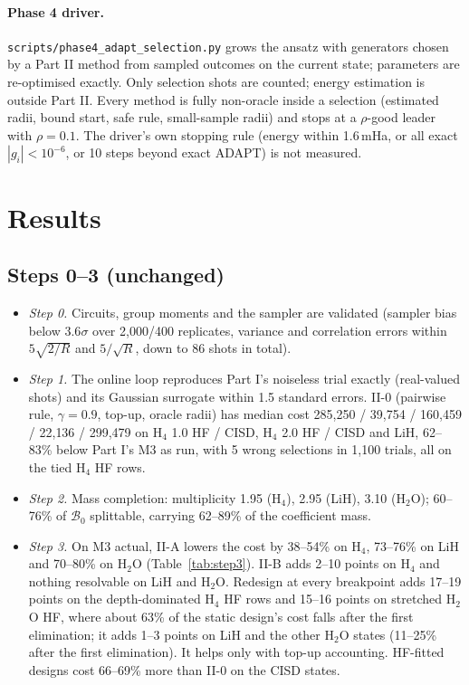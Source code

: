 \documentclass[10.5pt]{article}
\newcommand{\code}[1]{\texttt{#1}}
\begin{document}
\paragraph{Phase 4 driver.}
\code{scripts/phase4\_adapt\_selection.py} grows the ansatz with generators chosen by a Part II method from sampled outcomes on the current state; parameters are re-optimised exactly. Only selection shots are counted; energy estimation is outside Part II. Every method is fully non-oracle inside a selection (estimated radii, bound start, safe rule, small-sample radii) and stops at a $\rho$-good leader with $\rho=0.1$. The driver's own stopping rule (energy within 1.6\,mHa, or all exact $|g_i|<10^{-6}$, or 10 steps beyond exact ADAPT) is not measured.

\section{Results}
\label{sec:results}

\subsection{Steps 0--3 (unchanged)}

\begin{itemize}
  \item \emph{Step 0.} Circuits, group moments and the sampler are validated (sampler bias below $3.6\sigma$ over 2{,}000/400 replicates, variance and correlation errors within $5\sqrt{2/R}$ and $5/\sqrt R$, down to 86 shots in total).
  \item \emph{Step 1.} The online loop reproduces Part I's noiseless trial exactly (real-valued shots) and its Gaussian surrogate within 1.5 standard errors. II-0 (pairwise rule, $\gamma=0.9$, top-up, oracle radii) has median cost 285{,}250 / 39{,}754 / 160{,}459 / 22{,}136 / 299{,}479 on H$_4$ 1.0 HF / CISD, H$_4$ 2.0 HF / CISD and LiH, 62--83\% below Part I's M3 as run, with 5 wrong selections in 1{,}100 trials, all on the tied H$_4$ HF rows.
  \item \emph{Step 2.} Mass completion: multiplicity 1.95 (H$_4$), 2.95 (LiH), 3.10 (H$_2$O); 60--76\% of $\mathcal B_0$ splittable, carrying 62--89\% of the coefficient mass.
  \item \emph{Step 3.} On M3 actual, II-A lowers the cost by 38--54\% on H$_4$, 73--76\% on LiH and 70--80\% on H$_2$O (Table~\ref{tab:step3}). II-B adds 2--10 points on H$_4$ and nothing resolvable on LiH and H$_2$O. Redesign at every breakpoint adds 17--19 points on the depth-dominated H$_4$ HF rows and 15--16 points on stretched H$_2$O HF, where about 63\% of the static design's cost falls after the first elimination; it adds 1--3 points on LiH and the other H$_2$O states (11--25\% after the first elimination). It helps only with top-up accounting. HF-fitted designs cost 66--69\% more than II-0 on the CISD states.
\end{itemize}
\end{document}
